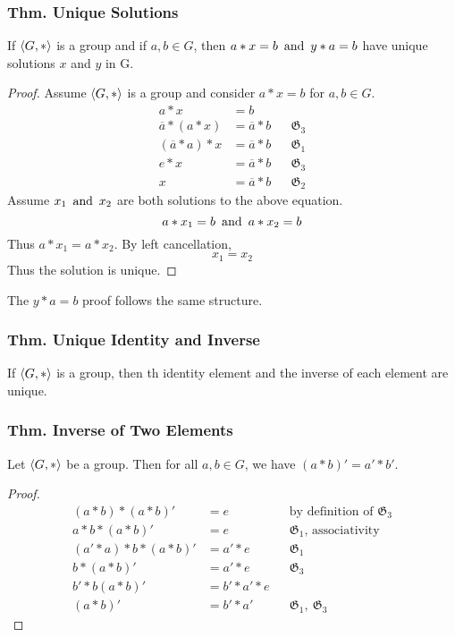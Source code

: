 \subsubsection{Thm. Unique Solutions}
If $\langle G,* \rangle$ is a group and if $a,b \in G$, then $a*x=b \operatorname{~\text{and}~} y*a=b$ have unique solutions $x$ and $y$ in G.
\begin{proof}
    Assume $\langle G,* \rangle$ is a group and consider $a*x=b$ for $a,b \in G$.
    \begin{align*}
        a*x & = b \\
        \overline{a} * (a*x) & = \overline{a} * b && \mathfrak{G}_3 \\
        (\overline{a} * a) *x & = \overline{a} * b && \mathfrak{G}_1 \\
        e * x & = \overline{a} * b && \mathfrak{G}_3 \\
        x & = \overline{a} * b && \mathfrak{G}_2
    \end{align*}
    Assume $x_1 \operatorname{~\text{and}~} x_2$ are both solutions to the above equation.
    \[
        a*x_1 =b \operatorname{~\text{and}~} a * x_2 = b
    \]
    Thus $a*x_1 = a*x_2$. By left cancellation,
    \[
        x_1 = x_2
    \]
    Thus the solution is unique.
\end{proof}
The $y*a=b$ proof follows the same structure.

\subsubsection{Thm. Unique Identity and Inverse}
If $\langle G,* \rangle$ is a group, then th identity element and the inverse of each element are unique.

\subsubsection{Thm. Inverse of Two Elements}
Let $\langle G,* \rangle$ be a group. Then for all $a,b \in G$, we have $(a*b)' = a' * b'$.
\begin{proof}
    \begin{align*}
        (a*b)*(a*b)' & = e && \text{by definition of $\mathfrak{G}_3$} \\
        a*b*(a*b)' & = e && \text{$\mathfrak{G}_1$, associativity} \\
        (a'*a)*b*(a*b)' & = a'*e && \mathfrak{G}_1 \\
        b*(a*b)' & = a'*e && \mathfrak{G}_3 \\
        b'*b(a*b)' & = b'*a'*e \\
        (a*b)' & = b'*a' && \mathfrak{G}_1,~\mathfrak{G}_3
    \end{align*}
\end{proof}


